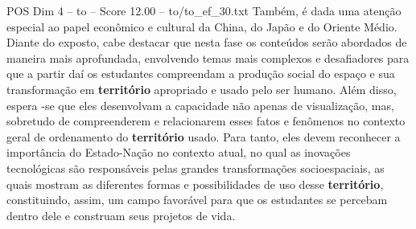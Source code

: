 \begin{textsample}{POS Dim 4 – to – Score 12.00 – to/to\_ef\_30.txt}
Também, é dada uma atenção especial ao papel econômico e cultural da China, do Japão e do Oriente Médio.
Diante do exposto, cabe destacar que nesta fase os conteúdos serão abordados de maneira mais aprofundada, envolvendo temas mais complexos e desafiadores para que a partir daí os estudantes compreendam a produção social do espaço e sua transformação em \textbf{território} apropriado e usado pelo ser humano.
Além disso, espera -se que eles desenvolvam a capacidade não apenas de visualização, mas, sobretudo de compreenderem e relacionarem esses fatos e fenômenos no contexto geral de ordenamento do \textbf{território} usado.
Para tanto, eles devem reconhecer a importância do Estado-Nação no contexto atual, no qual as inovações tecnológicas são responsáveis pelas grandes transformações socioespaciais, as quais mostram as diferentes formas e possibilidades de uso desse \textbf{território}, constituindo, assim, um campo favorável para que os estudantes se percebam dentro dele e construam seus projetos de vida.

\end{textsample}
